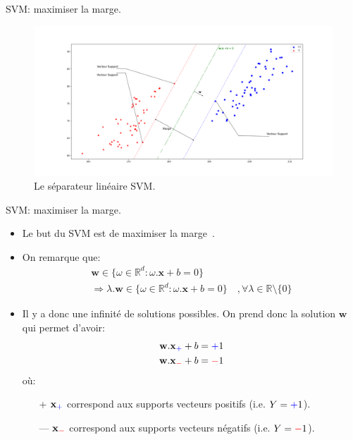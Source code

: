 \documentclass[8pt]{beamer}
\begin{document}
	\begin{frame}{SVM\@: maximiser la marge.}
		\begin{figure}[H]
			\includegraphics[width=\textwidth]{images/samples/svm}
			\caption{ Le séparateur linéaire SVM.}
		\end{figure}
	\end{frame}

	\begin{frame}{SVM\@: maximiser la marge.}
		\begin{itemize}
			\item  Le but du SVM est de maximiser la marge~\cite{vapnik1998statistical}.
			\item  On remarque que:
			\begin{gather*}
				\textbf{w} \in \{\omega \in \mathbb{R}^d : \omega.\textbf{x} + b = 0\} \\
				\Rightarrow
				\lambda . \textbf{w} \in \{\omega \in \mathbb{R}^d : \omega.\textbf{x} + b = 0\}\quad, \forall \lambda \in \mathbb{R}\setminus\{0\}
			\end{gather*}
			\item  Il y a donc une infinité de solutions possibles. On prend donc la solution $\textbf{w}$ qui permet d'avoir:
			\begin{align}
				\textbf{w}.\textbf{x}_{\color{blue}+} + b &= {\color{blue}+}1 \\
				\textbf{w}.\textbf{x}_{\color{red}-} + b &= {\color{red}-}1
			\end{align}
			où:
			\begin{itemize}
				\item[{\color{blue}+}] $\textbf{x}_{\color{blue}+}$ correspond aux supports vecteurs positifs (i.e. $Y={\color{blue}+}1$).
				\item[{\color{red}---}] $\textbf{x}_{\color{red}-}$ correspond aux supports vecteurs négatifs (i.e. $Y={\color{red}-}1$).
			\end{itemize}
		\end{itemize}
	\end{frame}
\end{document}
